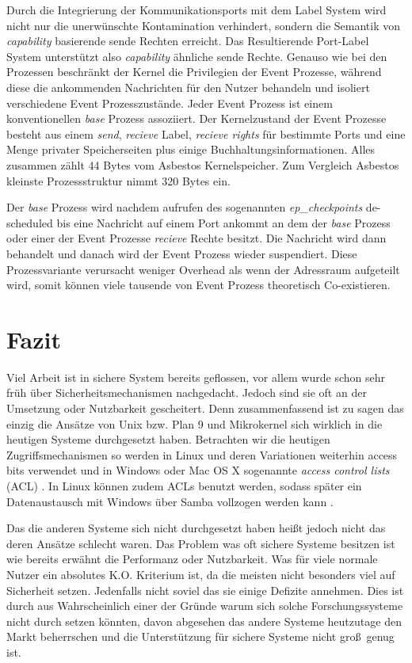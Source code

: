 \documentclass[11pt,technote]{IEEEtran}
\begin{document}
      Durch die Integrierung der Kommunikationsports mit dem Label System wird nicht nur die unerw\"unschte Kontamination verhindert, sondern die Semantik von
      \textit{capability} basierende sende Rechten erreicht. Das Resultierende Port-Label System unterst\"utzt also \textit{capability} \"ahnliche sende Rechte.
      Genauso wie bei den Prozessen beschr\"ankt der Kernel die Privilegien der Event Prozesse, w\"ahrend diese die ankommenden Nachrichten f\"ur den Nutzer
      behandeln und isoliert verschiedene Event Prozesszust\"ande.
      Jeder Event Prozess ist einem konventionellen \textit{base} Prozess assoziiert. Der Kernelzustand der Event Prozesse besteht aus einem \textit{send}, 
      \textit{recieve} Label, \textit{recieve rights} f\"ur bestimmte Ports und eine Menge privater Speicherseiten plus einige Buchhaltungsinformationen.
      Alles zusammen z\"ahlt 44 Bytes vom Asbestos Kernelspeicher. Zum Vergleich Asbestos kleinste Prozessstruktur nimmt 320 Bytes ein. 
      
      Der \textit{base} Prozess wird nachdem aufrufen des sogenannten \textit{ep\_checkpoints} de-scheduled bis eine Nachricht auf einem Port ankommt 
      an dem der \textit{base} Prozess oder einer der Event Prozesse \textit{recieve} Rechte besitzt.
      Die Nachricht wird dann behandelt und danach wird der Event Prozess wieder suspendiert. Diese Prozessvariante verursacht weniger Overhead als wenn der
      Adressraum aufgeteilt wird, somit k\"onnen viele tausende von Event Prozess theoretisch Co-existieren.
      
     
  \section{Fazit}
    Viel Arbeit ist in sichere System bereits geflossen, vor allem wurde schon sehr fr\"uh \"uber Sicherheitsmechanismen nachgedacht.
    Jedoch sind sie oft an der Umsetzung oder Nutzbarkeit gescheitert. Denn zusammenfassend ist zu sagen das einzig die Ans\"atze von Unix bzw. Plan
    9 und Mikrokernel sich wirklich in die heutigen Systeme durchgesetzt haben. Betrachten wir die heutigen Zugriffsmechanismen so werden in Linux 
    und deren Variationen weiterhin access bits verwendet und in Windows oder Mac OS X sogenannte \textit{access control lists} (ACL)
    \cite{Url:windows:acl, Url:macosx:acl}. In Linux k\"onnen zudem ACLs benutzt werden, sodass sp\"ater ein Datenaustausch mit Windows \"uber
    Samba vollzogen werden kann \cite{Url:linux:acl}.    
    
    Das die anderen Systeme sich nicht durchgesetzt haben hei\ss t jedoch nicht das deren Ans\"atze schlecht waren.
    Das Problem was oft sichere Systeme besitzen ist wie bereits erw\"ahnt die Performanz oder Nutzbarkeit. Was f\"ur 
    viele normale Nutzer ein absolutes K.O. Kriterium ist, da die meisten nicht besonders viel auf Sicherheit setzen.
    Jedenfalls nicht soviel das sie einige Defizite annehmen. Dies ist durch aus Wahrscheinlich einer der Gr\"unde warum sich solche
    Forschungssysteme nicht durch setzen k\"onnten, davon abgesehen das andere Systeme heutzutage den Markt beherrschen und
    die Unterst\"utzung f\"ur sichere Systeme nicht gro\ss\ genug ist.   
    
    


\end{document}
